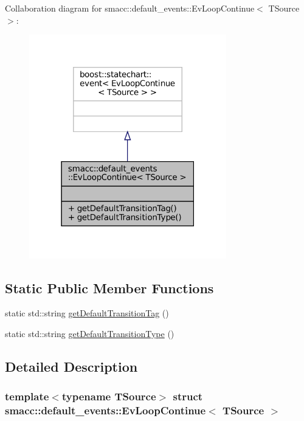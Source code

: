 Collaboration diagram for smacc\+:\+:default\+\_\+events\+:\+:Ev\+Loop\+Continue$<$ T\+Source $>$\+:
\nopagebreak
\begin{figure}[H]
\begin{center}
\leavevmode
\includegraphics[width=243pt]{structsmacc_1_1default__events_1_1EvLoopContinue__coll__graph}
\end{center}
\end{figure}
\subsection*{Static Public Member Functions}
\begin{DoxyCompactItemize}
\item 
static std\+::string \hyperlink{structsmacc_1_1default__events_1_1EvLoopContinue_ae00f172d20325e8ce0a91bf3d7945992}{get\+Default\+Transition\+Tag} ()
\item 
static std\+::string \hyperlink{structsmacc_1_1default__events_1_1EvLoopContinue_a16ed3e9e57f615cd748c8a65956ca48c}{get\+Default\+Transition\+Type} ()
\end{DoxyCompactItemize}


\subsection{Detailed Description}
\subsubsection*{template$<$typename T\+Source$>$\newline
struct smacc\+::default\+\_\+events\+::\+Ev\+Loop\+Continue$<$ T\+Source $>$}



